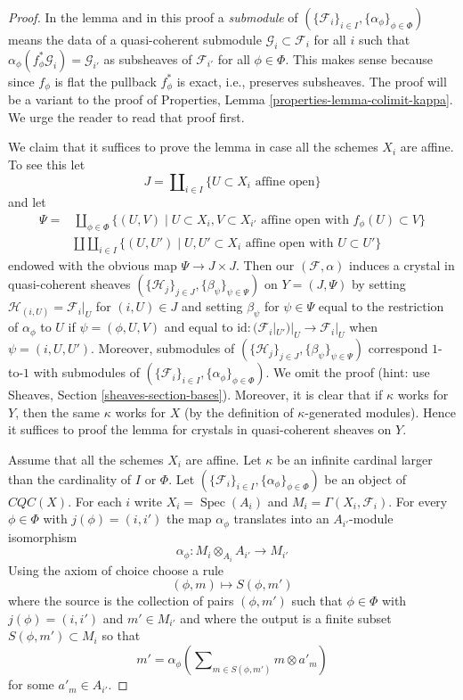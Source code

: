 \documentclass{stacks-project}
\theoremstyle{plain}
\theoremstyle{definition}
\theoremstyle{remark}
\numberwithin{equation}{subsection}
\def\Spec{\mathop{\mathrm{Spec}}}
\begin{document}
\begin{proof}
In the lemma and in this proof a {\it submodule} of
$(\{\mathcal{F}_i\}_{i \in I}, \{\alpha_\phi\}_{\phi \in \Phi})$
means the data of a quasi-coherent submodule
$\mathcal{G}_i \subset \mathcal{F}_i$ for all $i$ such that
$\alpha_\phi(f_\phi^*\mathcal{G}_i) = \mathcal{G}_{i'}$
as subsheaves of $\mathcal{F}_{i'}$ for all $\phi \in \Phi$.
This makes sense because since $f_\phi$ is flat the
pullback $f^*_\phi$ is exact, i.e., preserves subsheaves.
The proof will be a variant to the proof of
Properties, Lemma \ref{properties-lemma-colimit-kappa}.
We urge the reader to read that proof first.

\medskip\noindent
We claim that it suffices to prove the lemma in case all the schemes
$X_i$ are affine. To see this let
$$
J = \coprod\nolimits_{i \in I} \{U \subset X_i\text{ affine open}\}
$$
and let
\begin{align*}
\Psi = & \coprod\nolimits_{\phi \in \Phi}
\{
(U, V) \mid
U \subset X_i, V \subset X_{i'}\text{ affine open with } f_\phi(U) \subset V
\} \\
&
\amalg \coprod\nolimits_{i \in I}
\{
(U, U') \mid
U, U' \subset X_i\text{ affine open with } U \subset U'
\}
\end{align*}
endowed with the obvious map $\Psi \to J \times J$. Then our
$(\mathcal{F}, \alpha)$ induces a crystal in quasi-coherent sheaves
$(\{\mathcal{H}_j\}_{j \in J}, \{\beta_\psi\}_{\psi \in \Psi})$
on $Y = (J, \Psi)$ by setting $\mathcal{H}_{(i, U)} = \mathcal{F}_i|_U$
for $(i, U) \in J$ and setting $\beta_\psi$ for $\psi \in \Psi$
equal to the restriction of $\alpha_\phi$ to $U$
if $\psi = (\phi, U, V)$ and
equal to $\text{id} : (\mathcal{F}_i|_{U'})|_U \to \mathcal{F}_i|_U$
when $\psi = (i, U, U')$. Moreover, submodules of
$(\{\mathcal{H}_j\}_{j \in J}, \{\beta_\psi\}_{\psi \in \Psi})$
correspond $1$-to-$1$ with submodules of
$(\{\mathcal{F}_i\}_{i \in I}, \{\alpha_\phi\}_{\phi \in \Phi})$.
We omit the proof (hint: use
Sheaves, Section \ref{sheaves-section-bases}).
Moreover, it is clear that if $\kappa$ works for $Y$, then
the same $\kappa$ works for $X$ (by the definition of $\kappa$-generated
modules). Hence it suffices to proof the lemma for crystals in
quasi-coherent sheaves on $Y$.

\medskip\noindent
Assume that all the schemes $X_i$ are affine. Let $\kappa$ be an infinite
cardinal larger than the cardinality of $I$ or $\Phi$. Let
$(\{\mathcal{F}_i\}_{i \in I}, \{\alpha_\phi\}_{\phi \in \Phi})$
be an object of $\textit{CQC}(X)$. For each $i$ write
$X_i = \Spec(A_i)$ and $M_i = \Gamma(X_i, \mathcal{F}_i)$.
For every $\phi \in \Phi$ with $j(\phi) = (i, i')$ the map
$\alpha_\phi$ translates into an $A_{i'}$-module isomorphism
$$
\alpha_\phi : M_i \otimes_{A_i} A_{i'} \longrightarrow M_{i'}
$$
Using the axiom of choice choose a rule
$$
(\phi, m) \longmapsto S(\phi, m')
$$
where the source is the collection of pairs $(\phi, m')$ such that
$\phi \in \Phi$ with $j(\phi) = (i, i')$ and $m' \in M_{i'}$ and
where the output is a finite subset $S(\phi, m') \subset M_i$ so that
$$
m' = \alpha_\phi\left(\sum\nolimits_{m \in S(\phi, m')} m \otimes a'_m\right)
$$
for some $a'_m \in A_{i'}$.


\end{proof}
\end{document}

